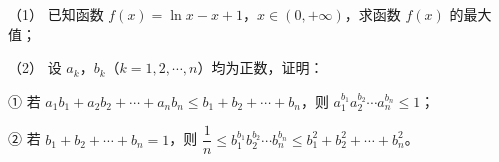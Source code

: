 \begin{question}
（1） 已知函数 $f(x)=\ln x-x+1$，$x\in(0,+\infty)$，求函数 $f(x)$ 的最大值；

（2） 设 $a_k$，$b_k$（$k=1,2,\cdots,n$）均为正数，证明：

① 若 $a_1b_1+a_2b_2+\cdots+a_nb_n\leqslant b_1+b_2+\cdots+b_n$，则 $a_1^{b_1}a_2^{b_2}\cdots a_n^{b_n}\leqslant1$；

② 若 $b_1+b_2+\cdots+b_n=1$，则 $\dfrac1n\leqslant b_1^{b_1}b_2^{b_2}\cdots b_n^{b_n}\leqslant b_1^2+b_2^2+\cdots+b_n^2$。

\end{question}